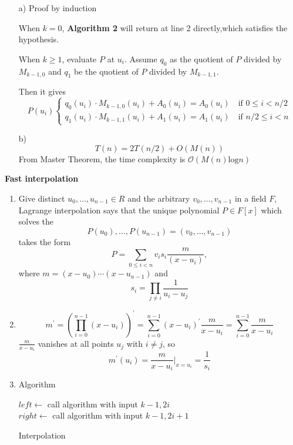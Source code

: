 \documentclass{assignment}
\begin{document}
\begin{homeworkProblem}
\begin{enumerate}
\begin{enumerate}
\item[a)] Proof by induction 

When $k=0$, \textbf{Algorithm 2} will return at line 2 directly,which satisfies the hypothesis. 

When $k \geq 1$, evaluate $P$ at $u_i$. Assume $q_0$ as the quotient of $P$ divided by $M_{k-1,0}$ and $q_1$ be the quotient of $P$ divided by $M_{k-1,1}$. 

Then it gives 
\begin{equation*}
P(u_i) \begin{cases}
q_0(u_i)\cdot M_{k-1,0}(u_i) + A_0(u_i)=A_0(u_i) \quad \text{if } 0\leq i < n/2 \\
 q_1(u_i)\cdot M_{k-1,1}(u_i) + A_1(u_i)=A_1(u_i) \quad \text{if } n/2\leq i < n
\end{cases}
\end{equation*}

\item[b)] 
$$T(n)=2T(n/2) + O(M(n))$$
From Master Theorem, the time complexity is $\mathcal{O}(M(n)\text{log}n)$


\end{enumerate}
\end{enumerate}
\newpage
\begin{center}
\textbf{Fast interpolation}
\end{center}  

\begin{enumerate}
\item 
Give distinct $u_0,\dots, u_{n-1} \in R$ and the arbitrary $v_0,\dots, v_{n-1}$ in a field $F$, Lagrange interpolation says that the unique polynomial $P\in F[x]$ which solves the 
$$P(u_0),\dots, P(u_{n-1})=(v_0,\dots, v_{n-1})$$
takes the form $$P=\sum_{0\leq i < n} v_is_i\frac{m}{(x-u_i)},$$
where $m=(x-u_0)\cdots (x-u_{n-1})$ and 
$$s_i=\prod_{j\neq i} \frac{1}{u_i - u_j}$$

\item 
$$m^{'} = \left( \prod_{i=0}^{n-1}(x-u_i) \right)^{'} = \sum_{i=0}^{n-1} (x-u_i)^{'} \frac{m}{x-u_i} = \sum_{i=0}^{n-1} \frac{m}{x-u_i}$$ 
$\frac{m}{x-u_i}$ vanishes at all points $u_j$ with $i\neq j$, so 
$$m^{'}(u_i)=\frac{m}{x-u_i}|_{x=u_i}=\frac{1}{s_i}$$
\item Algorithm 

\begin{algorithm}[H]
 \BlankLine
{} {}
$left \leftarrow$ call algorithm with input $k-1, 2i$\\
$right \leftarrow$ call algorithm with input $k-1,2i+1$\\
\caption{Interpolation} \end{algorithm}


\end{enumerate}
\end{homeworkProblem}
\end{document}
